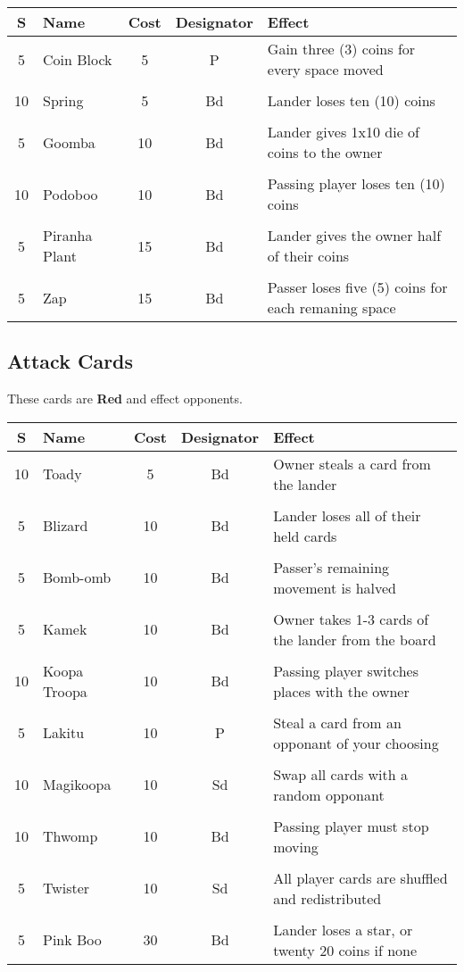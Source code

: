 \documentclass{article}
\begin{document}
\begin{tabular}{clccl}
\textbf{S} & \textbf{Name} & \textbf{Cost} & \textbf{Designator}
& \textbf{Effect} \\
\hline
5 & Coin Block & 5 & P & Gain three (3) coins for every space moved \\
&&&& \\
10 & Spring & 5 & Bd & Lander loses ten (10) coins \\
&&&& \\
5 & Goomba & 10 & Bd & Lander gives 1x10 die of coins to the owner \\
&&&& \\
10 & Podoboo & 10 & Bd & Passing player loses ten (10) coins \\
&&&& \\
5 & Piranha Plant & 15 & Bd & Lander gives the owner half of their coins \\
&&&& \\
5 & Zap & 15 & Bd & Passer loses five (5) coins for each remaning space \\
\end{tabular}

\subsection{Attack Cards}

These cards are \textbf{Red} and effect opponents.
\vspace*{2ex}

\begin{tabular}{clccl}
\textbf{S} & \textbf{Name} & \textbf{Cost} & \textbf{Designator} & \textbf{Effect} \\
\hline
10 & Toady & 5 & Bd & Owner steals a card from the lander \\
&&&& \\
5 & Blizard & 10 & Bd & Lander loses all of their held cards \\
&&&& \\
5 & Bomb-omb & 10 & Bd & Passer's remaining movement is halved \\
&&&& \\
5 & Kamek & 10 & Bd & Owner takes 1-3 cards of the lander from the board \\
&&&& \\
10 & Koopa Troopa & 10 & Bd & Passing player switches places with the owner \\
&&&& \\
5 & Lakitu & 10 & P & Steal a card from an opponant of your choosing \\
&&&& \\
10 & Magikoopa & 10 & Sd & Swap all cards with a random opponant \\
&&&& \\
10 & Thwomp & 10 & Bd & Passing player must stop moving \\
&&&& \\
5 & Twister & 10 & Sd & All player cards are shuffled and redistributed \\
&&&& \\
5 & Pink Boo & 30 & Bd & Lander loses a star, or twenty 20 coins if none \\
\end{tabular}
\end{document}

